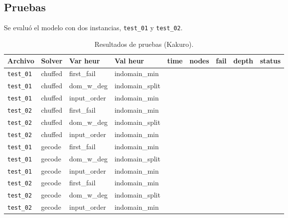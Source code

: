 
\subsection{Pruebas}\label{sec:02-kakuro-pruebas}
Se evaluó el modelo con dos instancias, \texttt{test\_01} y \texttt{test\_02}.

\begin{compactfloats}
    \begin{table}[H]
      \centering
      \small
      \setlength{\tabcolsep}{3pt}
      \caption{Resultados de pruebas (Kakuro).}
      \label{tab:pruebas-kakuro}
      \begin{tabular}{l l l l r r r r l}
        \toprule
        \textbf{Archivo} & \textbf{Solver} & \textbf{Var heur} & \textbf{Val heur} & \textbf{time} & \textbf{nodes} & \textbf{fail} & \textbf{depth} & \textbf{status} \\
        \midrule
        \texttt{test\_01} & chuffed & first\_fail & indomain\_min   &  &  &  &  &  \\
        \texttt{test\_01} & chuffed & dom\_w\_deg  & indomain\_split &  &  &  &  &  \\
        \texttt{test\_01} & chuffed & input\_order & indomain\_min   &  &  &  &  &  \\
        \texttt{test\_02} & chuffed & first\_fail & indomain\_min   &  &  &  &  &  \\
        \texttt{test\_02} & chuffed & dom\_w\_deg  & indomain\_split &  &  &  &  &  \\
        \texttt{test\_02} & chuffed & input\_order & indomain\_min   &  &  &  &  &  \\
        \midrule
        \texttt{test\_01} & gecode  & first\_fail & indomain\_min   &  &  &  &  &  \\
        \texttt{test\_01} & gecode  & dom\_w\_deg  & indomain\_split &  &  &  &  &  \\
        \texttt{test\_01} & gecode  & input\_order & indomain\_min   &  &  &  &  &  \\
        \texttt{test\_02} & gecode  & first\_fail & indomain\_min   &  &  &  &  &  \\
        \texttt{test\_02} & gecode  & dom\_w\_deg  & indomain\_split &  &  &  &  &  \\
        \texttt{test\_02} & gecode  & input\_order & indomain\_min   &  &  &  &  &  \\
        \bottomrule
      \end{tabular}
    \end{table}
  \end{compactfloats}